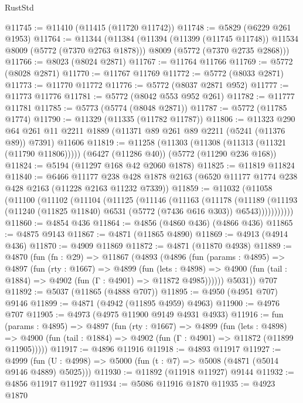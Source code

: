 \begin{lexlean}{RustStd}
\begin{coremodule}
@11745 := @11410 (@11415 (@11720 @11742))
@11748 := @5829 (@6229 @261 @1953)
@11764 := @11344
    (@11384
      (@11394 (@11399 (@11745 @11748)) @11534 @8009 (@5772 (@7370 @2763 @1878)))
      @8009
      (@5772 (@7370 @2735 @2868)))
@11766 := @8023 (@8024 @2871)
@11767 := @11764 @11766
@11769 := @5772 (@8028 @2871)
@11770 := @11767 @11769
@11772 := @5772 (@8033 @2871)
@11773 := @11770 @11772
@11776 := @5772 (@8037 @2871 @952)
@11777 := @11773 @11776
@11781 := @5772 (@8042 @553 @952 @261)
@11782 := @11777 @11781
@11785 := @5773 (@5774 (@8048 @2871))
@11787 := @5772 (@11785 @1774)
@11790 := @11329 (@11335 (@11782 @11787))
@11806 := @11323
    @290
    @64
    @261
    @11
    @2211
    @1889
    (@11371 @89 @261 @89 @2211 (@5241 (@11376 @89)) @7391)
    @11606
@11819 := @11258
    (@11303 (@11308 (@11313 (@11321 (@11790 @11806)))))
    (@6427 (@11286 @40))
    (@5772 (@11290 @236 @168))
@11824 := @5194 (@11297 @168 @42 @2060 @1878)
@11825 := @11819 @11824
@11840 := @6466
    @11177
    @238
    @428
    @1878
    @2163
    (@6520 @11177 @1774 @238 @428 @2163 (@11228 @2163 @11232 @7339))
@11859 := @11032
    (@11058
      (@11100
        (@11102
          (@11104
            (@11125
              (@11146
                (@11163
                  (@11178
                    (@11189
                      (@11193
                        (@11240 (@11825 @11840) @6531 (@5772 (@7436 @616 @303)) @6543)))))))))))
@11860 := @4854 @436
@11864 := @4856 (@4860 @436) (@4866 @436)
@11865 := @4875 @9143
@11867 := @4871 (@11865 @4890)
@11869 := @4913 (@4914 @436)
@11870 := @4909 @11869
@11872 := @4871 (@11870 @4938)
@11889 := @4870
    (fun (fn : @29) =>
    @11867
      (@4893
        (@4896
          (fun (params : @4895) =>
          @4897
            (fun (rty : @1667) =>
            @4899
              (fun (lets : @4898) =>
              @4900 (fun (tail : @1884) => @4902 (fun (Γ : @4901) => @11872 @4985))))))
        @5031))
    @707
@11892 := @5037 (@11865 (@4888 @707))
@11895 := @4950 (@4951 @707) @9146
@11899 := @4871 (@4942 (@11895 @4959) @4963)
@11900 := @4976 @707
@11905 := @4973 (@4975 @11900 @9149 @4931 @4933)
@11916 := fun (params : @4895) =>
  @4897
    (fun (rty : @1667) =>
    @4899
      (fun (lets : @4898) =>
      @4900 (fun (tail : @1884) => @4902 (fun (Γ : @4901) => @11872 (@11899 @11905)))))
@11917 := @4896 @11916
@11918 := @4893 @11917
@11927 := @4999 (fun (U : @4998) => @5000 (fun (t : @7) => @5008 (@4871 (@5014 @9146 @4889) @5025)))
@11930 := @11892 (@11918 @11927) @9144
@11932 := @4856 @11917 @11927
@11934 := @5086 @11916 @1870
@11935 := @4923 @1870

\end{coremodule}
\end{lexlean}
